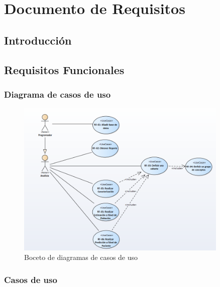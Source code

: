 \chapter{Documento de Requisitos}\label{cap:06requisitos}

\section{Introducción}






\section{Requisitos Funcionales}

\subsection{Diagrama de casos de uso}

\begin{figure}[H]
    \centering
    \includegraphics[width=0.90\textwidth]{figures/draftDiagramaCasosUso.png}
    \caption{Boceto de diagramas de casos de uso}
    \label{fig:draftDiagramaCasosUso}
\end{figure}

\subsection{Casos de uso}


